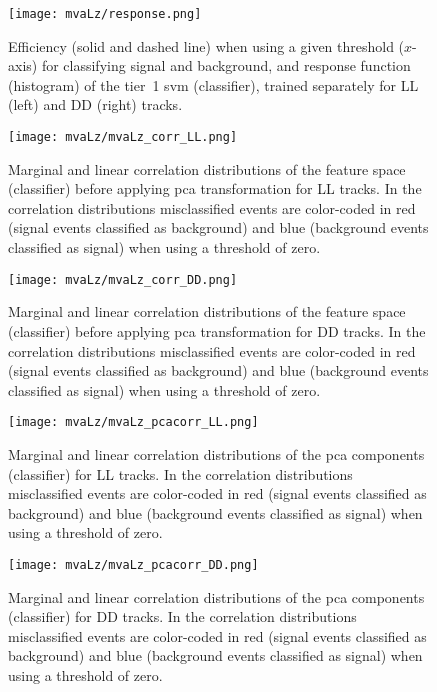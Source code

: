 \begin{figure}[htbp]
    \centering
    \texttt{[image: mvaLz/response.png]}
    \caption{Efficiency (solid and dashed line) when using a given threshold ($x$-axis) for classifying signal and background, and response function (histogram) of the tier~1 \gls{svm} (\Lz classifier), trained separately for \gls{LL} (left) and \gls{DD} (right) tracks.}
    \label{fig:mvaLz_response}
\end{figure}

\begin{figure}[htbp]
    \centering
    \texttt{[image: mvaLz/mvaLz\_corr\_LL.png]}
    \caption{Marginal and linear correlation distributions of the feature space (\Lz classifier) before applying \gls{pca} transformation for \gls{LL} tracks. In the correlation distributions misclassified events are color-coded in red (signal events classified as background) and blue (background events classified as signal) when using a threshold of zero.}
    \label{fig:mvaLz_corr_LL}
\end{figure}

\begin{figure}[htbp]
    \centering
    \texttt{[image: mvaLz/mvaLz\_corr\_DD.png]}
    \caption{Marginal and linear correlation distributions of the feature space (\Lz classifier) before applying \gls{pca} transformation for \gls{DD} tracks. In the correlation distributions misclassified events are color-coded in red (signal events classified as background) and blue (background events classified as signal) when using a threshold of zero.}
    \label{fig:mvaLz_corr_DD}
\end{figure}

\begin{figure}[htbp]
    \centering
    \texttt{[image: mvaLz/mvaLz\_pcacorr\_LL.png]}
    \caption{Marginal and linear correlation distributions of the \gls{pca} components (\Lz classifier) for \gls{LL} tracks. In the correlation distributions misclassified events are color-coded in red (signal events classified as background) and blue (background events classified as signal) when using a threshold of zero.}
    \label{fig:mvaLz_pcacorr_LL}
\end{figure}

\begin{figure}[htbp]
    \centering
    \texttt{[image: mvaLz/mvaLz\_pcacorr\_DD.png]}
    \caption{Marginal and linear correlation distributions of the \gls{pca} components (\Lz classifier) for \gls{DD} tracks. In the correlation distributions misclassified events are color-coded in red (signal events classified as background) and blue (background events classified as signal) when using a threshold of zero.}
    \label{fig:mvaLz_pcacorr_DD}
\end{figure}


